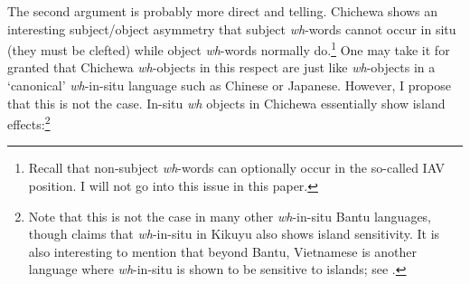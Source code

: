 \documentclass[output=paper,colorlinks,citecolor=brown
]{langscibook}
\begin{document}
The second argument is probably more direct and telling. Chichewa shows an interesting subject/object asymmetry that subject \textit{wh}-words cannot occur in situ (they must be clefted) while object \textit{wh}-words normally do.\footnote{Recall that non-subject \textit{wh}-words can optionally occur in the so-called IAV position. I will not go into this issue in this paper.} One may take it for granted that Chichewa \textit{wh}-objects in this respect are just like \textit{wh}-objects in a `canonical' \textit{wh}-in-situ language such as Chinese or Japanese. However, I propose that this is not the case. In-situ \textit{wh} objects in Chichewa essentially show island effects:\footnote{Note that this is not the case in many other \textit{wh}-in-situ Bantu languages, though \citealt{bergvall1983wh} claims that \textit{wh}-in-situ in Kikuyu also shows island sensitivity. It is also interesting to mention that beyond Bantu, Vietnamese is another language where \textit{wh}-in-situ is shown to be sensitive to islands; see \citealt{bruening2006wh}.}

\label{ex:chen:whcomplexDP}
\z

\label{ex:chen:whsubject}
\z

\label{ex:chen:whadjunct}
\z
\end{document}
